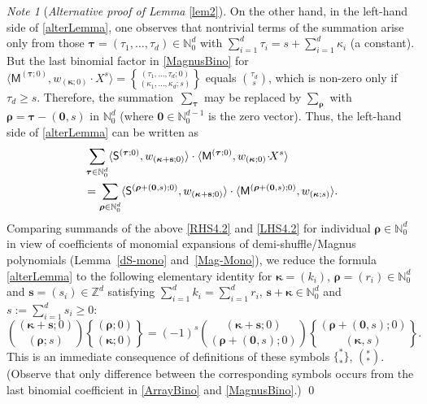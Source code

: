 \documentclass[10pt]{article}
\theoremstyle{definition}
\theoremstyle{remark}
\newtheorem{Note}[Theorem]{Note}
\DeclareRobustCommand{\magnus}{\genfrac\{\}{0pt}{}}
\def\MM{{\mathsf{M}}}
\def\SS{{\mathsf{S}}}
\def\bs{{\mathbf{s}}}
\def\bkappa{{\boldsymbol \kappa}}
\def\btau{{\boldsymbol \tau}}
\def\brho{{\boldsymbol \rho}}
\def\lp{\langle}
\def\rp{\rangle}
\def\N{{\mathbb N}}
\def\Z{{\mathbb Z}}
\def\bkappa{{\boldsymbol \kappa}}
\def\brho{{\boldsymbol \rho}}
\begin{document}
\begin{Note}[{\it Alternative proof of Lemma} \ref{lem2}]
On the other hand, in the left-hand side of  \eqref{alterLemma},
one observes that nontrivial terms of the summation arise
only from those $\btau=(\tau_1,\dots,\tau_d)\in\N_0^d$ with
$\sum_{i=1}^d \tau_i=s+\sum_{i=1}^d \kappa_i$ (a constant). 
But the last binomial factor in \eqref{MagnusBino} for
$ \lp\MM^{(\btau;0)}, w_{(\bkappa;0)}\!\cdot\!\! X^s\rp
=\magnus{(\tau_1,\dots,\tau_d;0)}{(\kappa_1,\dots,\kappa_d;s)}
$
equals $\binom{\tau_d}{s}$, which is non-zero only if
$\tau_d\ge s$.
Therefore, 
the summation~$\sum_\btau$ may be replaced by 
$\sum_\brho$ with $\brho=\btau-(\mathbf{0},s)$
in $\N_0^d$ (where $\mathbf{0}\in\N_0^{d-1}$ is the zero vector).
Thus,
the left-hand side of \eqref{alterLemma} can be written as
\begin{align}
\label{LHS4.2}
&\sum_{\btau\in\N_0^d} 
\lp\SS^{(\btau;0)},w_{(\bkappa+\bs;0)} \rp \cdot 
\lp\MM^{(\btau;0)}, w_{(\bkappa;0)}\!\cdot\!\! X^s\rp \\
&=
\sum_{\brho\in\N_0^d} 
\lp\SS^{(\brho+(\mathbf{0},s);0)},w_{(\bkappa+\bs;0)} \rp \cdot 
\lp\MM^{(\brho+(\mathbf{0},s);0)}, w_{(\bkappa;s)} \rp.
\notag
\end{align}
Comparing summands of the above \eqref{RHS4.2} and \eqref{LHS4.2} for 
individual $\brho\in\N_0^d$ in view of coefficients of 
monomial expansions of demi-shuffle/Magnus polynomials 
(Lemma~\ref{dS-mono} and~\eqref{Mag-Mono}), we reduce 
the formula \eqref{alterLemma} to the following elementary identity
for $\bkappa=(k_i)$, $\brho=(r_i)\in\N_0^d$ and $\bs=(s_i)\in\Z^d$
satisfying
$\sum_{i=1}^d k_i=\sum_{i=1}^d r_i$, $\bs+\bkappa\in \N_0^d$
and $s:=\sum_{i=1}^d s_i\ge 0$:
\begin{equation}
\binom{(\bkappa+\bs;0)}{(\brho;s)}
\magnus{(\brho;0)}{(\bkappa;0)}
=
(-1)^s
\binom{(\bkappa+\bs;0)}{(\brho+(\mathbf{0},s);0)}
\magnus{(\brho+(\mathbf{0},s);0)}{(\bkappa,s)}.
\end{equation} 
This is an immediate consequence of definitions
of these symbols $\{^*_* \}$, $(^*_*)$.
(Observe that only difference between the corresponding symbols
occurs from the last binomial coefficient in  \eqref{ArrayBino}
and \eqref{MagnusBino}.)
\qed
\end{Note}
\end{document}

